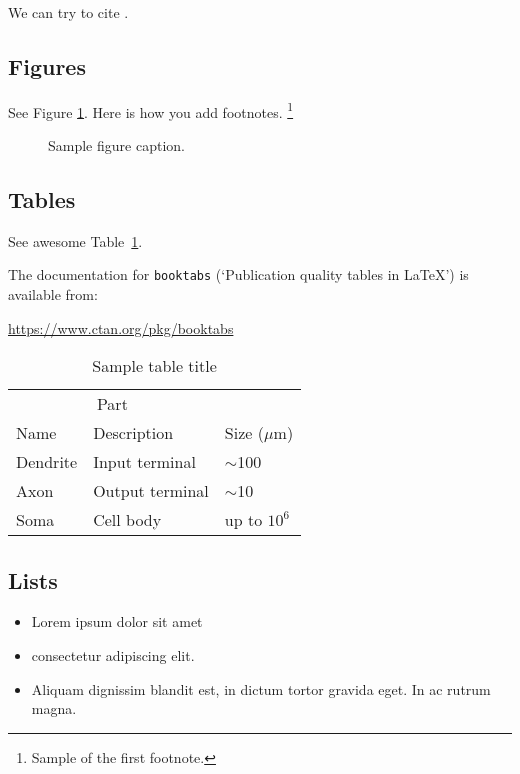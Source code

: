 \documentclass{article}
\begin{document}
We can try to cite \cite{hadash2018estimate,kour2014fast,kour2014real}.

\subsection{Figures}
\lipsum[10]
See Figure \ref{fig:fig1}. Here is how you add footnotes. \footnote{Sample of the first footnote.}
\lipsum[11]

\begin{figure}
	\centering
	\fbox{\rule[-.5cm]{4cm}{4cm} \rule[-.5cm]{4cm}{0cm}}
	\caption{Sample figure caption.}
	\label{fig:fig1}
\end{figure}

\subsection{Tables}
See awesome Table~\ref{tab:table}.

The documentation for \verb+booktabs+ (`Publication quality tables in LaTeX') is available from:
\begin{center}
	\url{https://www.ctan.org/pkg/booktabs}
\end{center}


\begin{table}
	\caption{Sample table title}
	\centering
	\begin{tabular}{lll}
		\toprule
		\multicolumn{2}{c}{Part}                   \\
		\cmidrule(r){1-2}
		Name     & Description     & Size ($\mu$m) \\
		\midrule
		Dendrite & Input terminal  & $\sim$100     \\
		Axon     & Output terminal & $\sim$10      \\
		Soma     & Cell body       & up to $10^6$  \\
		\bottomrule
	\end{tabular}
	\label{tab:table}
\end{table}

\subsection{Lists}
\begin{itemize}
	\item Lorem ipsum dolor sit amet
	\item consectetur adipiscing elit.
	\item Aliquam dignissim blandit est, in dictum tortor gravida eget. In ac rutrum magna.
\end{itemize}


\clearpage
\printbibliography
\end{document}
